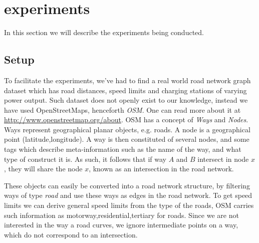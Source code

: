 \section{experiments} %
\label{sec:experiments}
In this section we will describe the experiments being conducted.
\subsection{Setup} %
\label{sub:setup}
To facilitate the experiments, we've had to find a real world road network graph dataset which has road distances, speed limits and charging stations of varying power output. Such dataset does not openly exist to our knowledge, instead we have used OpenStreetMaps, henceforth \textit{OSM}. One can read more about it at \url{http://www.openstreetmap.org/about}. OSM has a concept of \textit{Ways} and \textit{Nodes}. Ways represent geographical planar objects, e.g. roads. A node is a geographical point (latitude,longitude). A way is then constituted of several nodes, and some tags which describe meta-information such as the name of the way, and what type of construct it is. As such, it follows that if way $A$ and $B$ intersect in node $x$, they will share the node $x$, known as an intersection in the road network. 


These objects can easily be converted into a road network structure, by filtering ways of type \textit{road} and use these ways as edges in the road network. To get speed limits we can derive general speed limits from the type of the roads, OSM carries such information as motorway,residential,tertiary for roads. Since we are not interested in the way a road curves, we ignore intermediate points on a way, which do not correspond to an intersection.  

